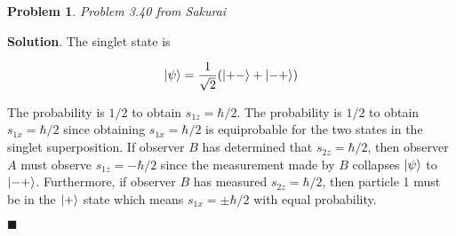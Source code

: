 \documentclass[12pt]{article}
\newtheorem{p}{Problem}
\theoremstyle{definition}
\newenvironment{s}{%
        \begin{trivlist} \item \textbf{Solution}. }{%
            \hspace*{\fill} $\blacksquare$\end{trivlist}}%
\begin{document}
{\begin{p}
Problem 3.40 from Sakurai
\end{p}

\begin{s}
The singlet state is 

\begin{align*}
\ket{\psi} = \frac{1}{\sqrt{2}}(\ket{+-} + \ket{-+})
\end{align*}

The probability is $1/2$ to obtain $s_{1z} = \hbar/2$. The probability is $1/2$ to obtain $s_{1x} = \hbar/2$ since obtaining $s_{1x} = \hbar/2$ is equiprobable for the two states in the singlet superposition. If observer $B$ has determined that $s_{2z} = \hbar/2$, then observer $A$ must observe $s_{1z} = -\hbar/2$ since the measurement made by $B$ collapses $\ket{\psi}$ to $\ket{-+}$. Furthermore, if observer $B$ has measured $s_{2z} = \hbar/2$, then particle 1 must be in the $\ket{+}$ state which means $s_{1x} = \pm \hbar/2$ with equal probability.

\end{s}
\end{document}
